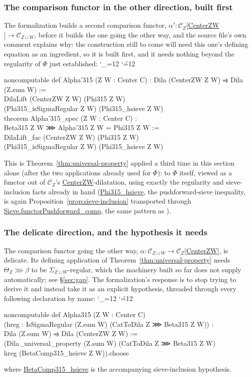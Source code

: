 \documentclass[11pt]{amsart}
\newcommand{\lc}[1]{\url{#1}}
\newenvironment{leancode}{%
  \begingroup
  \catcode`\_=12\relax
  \catcode`\^=12\relax
  \small\ttfamily\raggedright\baselineskip=1.15\baselineskip
  \par\smallskip\noindent
}{%
  \par\smallskip
  \endgroup
}
\theoremstyle{plain}
\theoremstyle{definition}
\theoremstyle{remark}
\newcommand{\calC}{\mathcal C}
\begin{document}
\subsubsection*{The comparison functor in the other direction, built first}
The formalization builds a second comparison functor,
$\alpha' : \calC_Z[$\lc{CenterZW}$] \to \calC_{Z\sqcup W}$, before it builds the one going the
other way, and the source file's own comment explains why: the construction still to come
will need this one's defining equation as an ingredient, so it is built first, and it needs
nothing beyond the regularity of $\Phi$ just established:
\begin{leancode}
noncomputable def Alpha'315 (Z W : Center C) : Dila (CenterZW Z W) ⥤ Dila (Z.sum W) := \\
  DilaLift (CenterZW Z W) (Phi315 Z W) \\
    (Phi315_isSigmaRegular Z W) (Phi315_hsieve Z W) \\[0.5\baselineskip]
theorem Alpha'315_spec (Z W : Center C) : \\
    Beta315 Z W ⋙ Alpha'315 Z W = Phi315 Z W := \\
  DilaLift_fac (CenterZW Z W) (Phi315 Z W) \\
    (Phi315_isSigmaRegular Z W) (Phi315_hsieve Z W) \\
\end{leancode}
This is Theorem~\ref{thm:universal-property} applied a third time in this section alone (after
the two applications already used for $\Phi$): to $\Phi$ itself, viewed as a functor out of
$\calC_Z$'s \lc{CenterZW}-dilatation, using exactly the regularity and sieve-inclusion facts
already in hand (\lc{Phi315_hsieve}, the pushforward-sieve inequality, is again
Proposition~\ref{prop:sieve-inclusion} transported through \lc{Sieve.functorPushforward_comp},
the same pattern as \citep[Fact~3.11]{Mayeux}).

\subsubsection*{The delicate direction, and the hypothesis it needs}
The comparison functor going the other way, $\alpha : \calC_{Z\sqcup W} \to
\calC_Z[$\lc{CenterZW}$]$, is delicate. Its defining
application of Theorem~\ref{thm:universal-property} needs $\Theta_Z\ggg\beta$ to be
$\Sigma_{Z\sqcup W}$-regular, which the machinery built so far does not supply automatically;
see \S\ref{sec:gap}. The formalization's response is to stop trying to derive it
and instead take it as an explicit hypothesis, threaded through every following declaration
by name:
\begin{leancode}
noncomputable def Alpha315 (Z W : Center C) \\
    (hreg : IsSigmaRegular (Z.sum W) (CatToDila Z ⋙ Beta315 Z W)) : \\
    Dila (Z.sum W) ⥤ Dila (CenterZW Z W) := \\
  (Dila_universal_property (Z.sum W) (CatToDila Z ⋙ Beta315 Z W) \\
      hreg (BetaComp315_hsieve Z W)).choose \\
\end{leancode}
where \lc{BetaComp315_hsieve} is the accompanying sieve-inclusion hypothesis.
\end{document}
